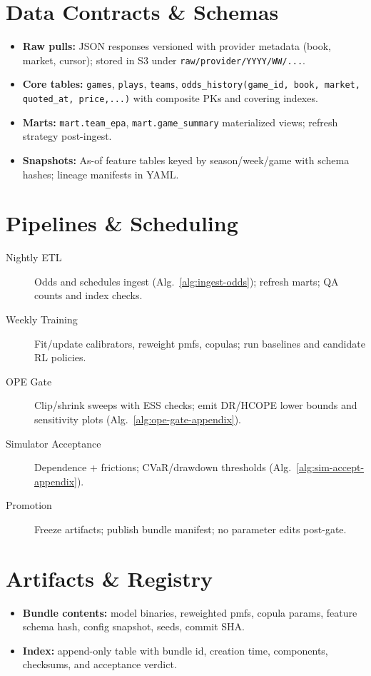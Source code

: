 \section{Data Contracts \& Schemas}
\begin{itemize}
  \item \textbf{Raw pulls:} JSON responses versioned with provider metadata (book, market, cursor); stored in S3 under \texttt{raw/provider/YYYY/WW/...}.
  \item \textbf{Core tables:} \texttt{games}, \texttt{plays}, \texttt{teams}, \texttt{odds\_history(game\_id, book, market, quoted\_at, price,...)} with composite PKs and covering indexes.
  \item \textbf{Marts:} \texttt{mart.team\_epa}, \texttt{mart.game\_summary} materialized views; refresh strategy post-ingest.
  \item \textbf{Snapshots:} As-of feature tables keyed by season/week/game with schema hashes; lineage manifests in YAML.
\end{itemize}

\section{Pipelines \& Scheduling}
\begin{description}
  \item[Nightly ETL] Odds and schedules ingest (Alg.~\ref{alg:ingest-odds}); refresh marts; QA counts and index checks.
  \item[Weekly Training] Fit/update calibrators, reweight pmfs, copulas; run baselines and candidate RL policies.
  \item[OPE Gate] Clip/shrink sweeps with ESS checks; emit DR/HCOPE lower bounds and sensitivity plots (Alg.~\ref{alg:ope-gate-appendix}).
  \item[Simulator Acceptance] Dependence + frictions; CVaR/drawdown thresholds (Alg.~\ref{alg:sim-accept-appendix}).
  \item[Promotion] Freeze artifacts; publish bundle manifest; no parameter edits post-gate.
\end{description}

\section{Artifacts \& Registry}
\begin{itemize}
  \item \textbf{Bundle contents:} model binaries, reweighted pmfs, copula params, feature schema hash, config snapshot, seeds, commit SHA.
  \item \textbf{Index:} append-only table with bundle id, creation time, components, checksums, and acceptance verdict.
\end{itemize}

